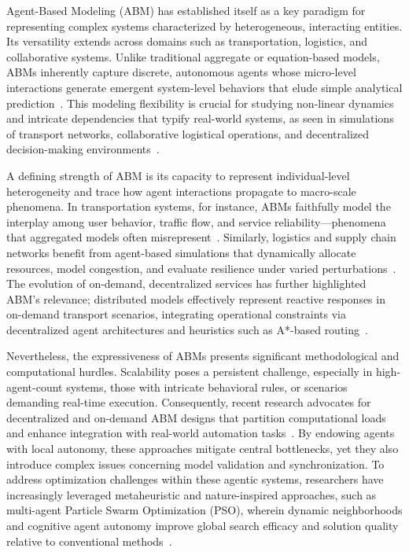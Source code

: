 \documentclass[sigconf]{acmart}
\begin{document}
Agent-Based Modeling (ABM) has established itself as a key paradigm for representing complex systems characterized by heterogeneous, interacting entities. Its versatility extends across domains such as transportation, logistics, and collaborative systems. Unlike traditional aggregate or equation-based models, ABMs inherently capture discrete, autonomous agents whose micro-level interactions generate emergent system-level behaviors that elude simple analytical prediction~\cite{ref114}\cite{ref115}. This modeling flexibility is crucial for studying non-linear dynamics and intricate dependencies that typify real-world systems, as seen in simulations of transport networks, collaborative logistical operations, and decentralized decision-making environments~\cite{ref114}\cite{ref115}.

A defining strength of ABM is its capacity to represent individual-level heterogeneity and trace how agent interactions propagate to macro-scale phenomena. In transportation systems, for instance, ABMs faithfully model the interplay among user behavior, traffic flow, and service reliability---phenomena that aggregated models often misrepresent~\cite{ref114}. Similarly, logistics and supply chain networks benefit from agent-based simulations that dynamically allocate resources, model congestion, and evaluate resilience under varied perturbations~\cite{ref115}. The evolution of on-demand, decentralized services has further highlighted ABM’s relevance; distributed models effectively represent reactive responses in on-demand transport scenarios, integrating operational constraints via decentralized agent architectures and heuristics such as A*-based routing~\cite{ref114}\cite{ref115}.

Nevertheless, the expressiveness of ABMs presents significant methodological and computational hurdles. Scalability poses a persistent challenge, especially in high-agent-count systems, those with intricate behavioral rules, or scenarios demanding real-time execution. Consequently, recent research advocates for decentralized and on-demand ABM designs that partition computational loads and enhance integration with real-world automation tasks~\cite{ref114}\cite{ref115}. By endowing agents with local autonomy, these approaches mitigate central bottlenecks, yet they also introduce complex issues concerning model validation and synchronization. To address optimization challenges within these agentic systems, researchers have increasingly leveraged metaheuristic and nature-inspired approaches, such as multi-agent Particle Swarm Optimization (PSO), wherein dynamic neighborhoods and cognitive agent autonomy improve global search efficacy and solution quality relative to conventional methods~\cite{ref101}.
\end{document}
